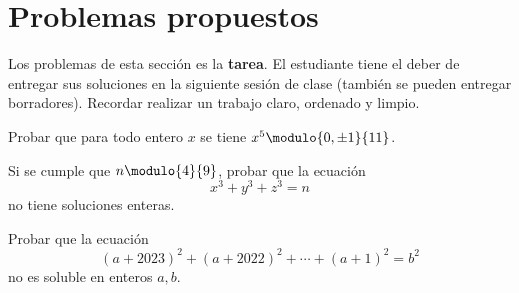 \section{Problemas propuestos}

Los problemas de esta sección es la \textbf{tarea}.
El estudiante tiene el deber de entregar sus soluciones en la siguiente sesión de clase (también se pueden entregar borradores).
Recordar realizar un trabajo claro, ordenado y limpio.

\begin{exercise}
    Probar que para todo entero $x$ se tiene $x^5 \modulo{0,\pm 1}{11}$.
\end{exercise}

\begin{problem}
    Si se cumple que $n \modulo{4}{9}$, probar que la ecuación
    \[
        x^3 + y^3 + z^3 = n
    \]
    no tiene soluciones enteras.
\end{problem}

\begin{problem}
    Probar que la ecuación
    \[
        (a + 2023)^2 + (a + 2022)^2 + \cdots + (a + 1)^2 = b^2
    \]
    no es soluble en enteros $a,b$.
\end{problem}
